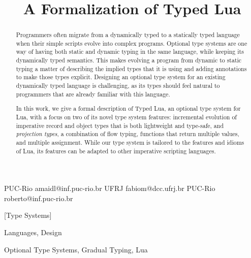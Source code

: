 \documentclass[10pt]{sigplanconf}
\begin{document}
\setlength{\pdfpageheight}{\paperheight}
\setlength{\pdfpagewidth}{\paperwidth}



\title{A Formalization of Typed Lua}

           {PUC-Rio}
           {amaidl@inf.puc-rio.br}
           {UFRJ}
           {fabiom@dcc.ufrj.br}
           {PUC-Rio}
           {roberto@inf.puc-rio.br}

\maketitle

\begin{abstract}
Programmers often migrate from a dynamically typed
to a statically typed language when their simple scripts
evolve into complex programs. Optional type systems are
one way of having both static and dynamic typing
in the same language, while keeping its dynamically typed
semantics. This makes evolving a program from dynamic to
static typing a matter of describing the implied types that
it is using and adding annotations to make those types explicit.
Designing an optional type system for
an existing dynamically typed language is challenging, as its types should feel natural to programmers that are already familiar with
this language.

In this work, we give a formal description of Typed Lua, an
optional type system for Lua, with a focus on two of its novel type system features: incremental evolution of imperative record and object types that is both lightweight and type-safe, and {\em projection types}, a combination of flow typing, functions that return multiple values, and multiple assignment. While our type system is tailored to the features and idioms of Lua, its features can be adapted to other imperative scripting languages.
\end{abstract}

[Type Systems]

\terms
Languages, Design

\keywords
Optional Type Systems, Gradual Typing, Lua
\end{document}
